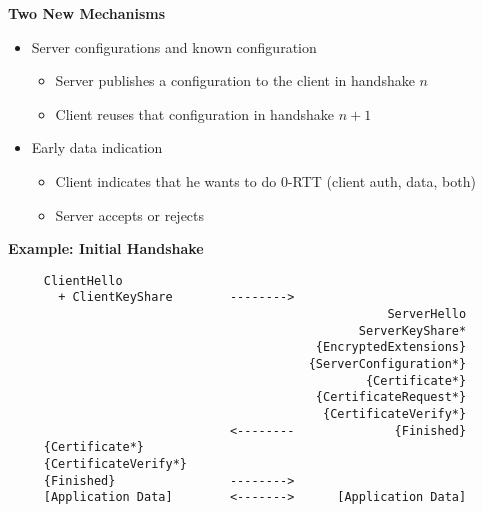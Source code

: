 \documentclass[helvetica]{seminar}
\newcommand{\heading}[1]{%
  \begin{center} 
    \large\bf 
    #1 
  \end{center} 
  \vspace{.4 in}}
\begin{document}
\begin{slide}
\heading{Two New Mechanisms}

\begin{itemize}
\item Server configurations and known configuration
  \begin{itemize}
  \item Server publishes a configuration to the client in handshake $n$
  \item Client reuses that configuration in handshake $n+1$
  \end{itemize}

\item Early data indication
  \begin{itemize}
  \item Client indicates that he wants to do 0-RTT (client auth, data, both)
  \item Server accepts or rejects
  \end{itemize}
\end{itemize}

\end{slide}
\begin{slide}
\heading{Example: Initial Handshake}

\vspace{-2ex}
\begin{footnotesize}
\begin{verbatim}
     ClientHello
       + ClientKeyShare        -------->
                                                     ServerHello
                                                 ServerKeyShare*
                                           {EncryptedExtensions}
                                          {ServerConfiguration*}
                                                  {Certificate*}
                                           {CertificateRequest*}
                                            {CertificateVerify*}
                               <--------              {Finished}
     {Certificate*}
     {CertificateVerify*}
     {Finished}                -------->
     [Application Data]        <------->      [Application Data]
\end{verbatim}
\end{footnotesize}
\end{slide}
\end{document}
